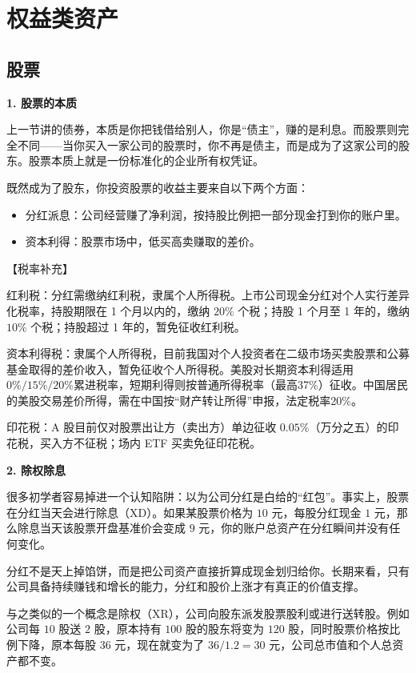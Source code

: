 \documentclass[12pt,openany]{book}
\newcommand{\subhead}[1]{%
    \par\vspace{0.5\baselineskip}%
    \noindent\textbf{#1}\par%
    \vspace{0.5\baselineskip}%
}
\begin{document}
\section{权益类资产}

\subsection{股票}

\subhead{1. 股票的本质}

上一节讲的债券，本质是你把钱借给别人，你是“债主”，赚的是利息。而股票则完全不同——当你买入一家公司的股票时，你不再是债主，而是成为了这家公司的股东。股票本质上就是一份标准化的企业所有权凭证。

既然成为了股东，你投资股票的收益主要来自以下两个方面：
\begin{itemize}
    \item 分红派息：公司经营赚了净利润，按持股比例把一部分现金打到你的账户里。
    \item 资本利得：股票市场中，低买高卖赚取的差价。
\end{itemize}

【税率补充】

红利税：分红需缴纳红利税，隶属个人所得税。上市公司现金分红对个人实行差异化税率，持股期限在 1 个月以内的，缴纳 $20\%$ 个税；持股 1 个月至 1 年的，缴纳 $10\%$ 个税；持股超过 1 年的，暂免征收红利税。

资本利得税：隶属个人所得税，目前我国对个人投资者在二级市场买卖股票和公募基金取得的差价收入，暂免征收个人所得税。美股对长期资本利得适用$0\%/15\%/20\%$累进税率，短期利得则按普通所得税率（最高37\%）征收。中国居民的美股交易差价所得，需在中国按“财产转让所得”申报，法定税率20\%。

印花税：A 股目前仅对股票出让方（卖出方）单边征收 $0.05\%$（万分之五）的印花税，买入方不征税；场内 ETF 买卖免征印花税。

\subhead{2. 除权除息}

很多初学者容易掉进一个认知陷阱：以为公司分红是白给的“红包”。事实上，股票在分红当天会进行除息（XD）。如果某股票价格为 $10$ 元，每股分红现金 $1$ 元，那么除息当天该股票开盘基准价会变成 $9$ 元，你的账户总资产在分红瞬间并没有任何变化。

分红不是天上掉馅饼，而是把公司资产直接折算成现金划归给你。长期来看，只有公司具备持续赚钱和增长的能力，分红和股价上涨才有真正的价值支撑。

与之类似的一个概念是除权（XR），公司向股东派发股票股利或进行送转股。例如公司每 $10$ 股送 $2$ 股，原本持有 $100$ 股的股东将变为 $120$ 股，同时股票价格按比例下降，原本每股 $36$ 元，现在就变为了 $36/1.2=30$ 元，公司总市值和个人总资产都不变。
\end{document}
